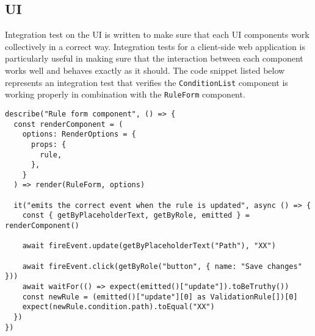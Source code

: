   \subsection{UI}

    Integration test on the UI is written to make sure that each UI components work collectively in a correct way. Integration tests for a client-side web application is particularly useful in making sure that the interaction between each component works well and behaves exactly as it should. The code snippet listed below represents an integration test that verifies the \verb;ConditionList; component is working properly in combination with the \verb;RuleForm; component. 
    
    \begin{lstlisting}[style=es6, caption={Integration test on the UI (TypeScript)}]
describe("Rule form component", () => {
  const renderComponent = (
    options: RenderOptions = {
      props: {
        rule,
      },
    }
  ) => render(RuleForm, options)

  it("emits the correct event when the rule is updated", async () => {
    const { getByPlaceholderText, getByRole, emitted } = renderComponent()

    await fireEvent.update(getByPlaceholderText("Path"), "XX")

    await fireEvent.click(getByRole("button", { name: "Save changes" }))
    await waitFor(() => expect(emitted()["update"]).toBeTruthy())
    const newRule = (emitted()["update"][0] as ValidationRule[])[0]
    expect(newRule.condition.path).toEqual("XX")
  })
})
\end{lstlisting}
